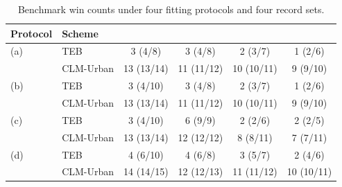 \begin{table}[p]
\centering\footnotesize
\caption{Benchmark win counts under four fitting protocols and four record sets.}
\label{tab:benchproto}
\setlength{\tabcolsep}{3pt}
\begingroup\scriptsize
\begin{tabular}{@{}llcccc@{}}
\toprule
Protocol & Scheme &  &  &  &  \\
\midrule
(a) & TEB & 3 (4/8) & 3 (4/8) & 2 (3/7) & 1 (2/6) \\
 & CLM-Urban & 13 (13/14) & 11 (11/12) & 10 (10/11) & 9 (9/10) \\
\addlinespace
(b) & TEB & 3 (4/10) & 3 (4/8) & 2 (3/7) & 1 (2/6) \\
 & CLM-Urban & 13 (13/14) & 11 (11/12) & 10 (10/11) & 9 (9/10) \\
\addlinespace
(c) & TEB & 3 (4/10) & 6 (9/9) & 2 (2/6) & 2 (2/5) \\
 & CLM-Urban & 13 (13/14) & 12 (12/12) & 8 (8/11) & 7 (7/11) \\
\addlinespace
(d) & TEB & 4 (6/10) & 4 (6/8) & 3 (5/7) & 2 (4/6) \\
 & CLM-Urban & 14 (14/15) & 12 (12/13) & 11 (11/12) & 10 (10/11) \\
\bottomrule
\end{tabular}
\endgroup
\par\vspace{2pt}{\scriptsize\raggedright Entries: records won against both informative benchmarks (against REG2/KM3 separately).\par}
\end{table}
